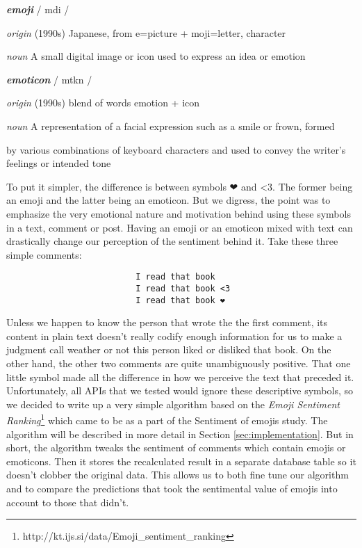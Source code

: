\textbf{\emph{emoji}} 
/ \textsci \textprimstress m\textschwa \textupsilon d\textyogh i /
\begin{adjustwidth}{1cm}{}
\emph{origin}
(1990s) Japanese, from e=picture + moji=letter, character
\end{adjustwidth}
\begin{adjustwidth}{1cm}{}
\emph{noun}
A small digital image or icon used to express an idea or emotion
\end{adjustwidth}

\textbf{\emph{emoticon}}  
/ \textsci \textprimstress m\textschwa \textupsilon t\textsci k\textturnscripta n /
\begin{adjustwidth}{1cm}{}
\emph{origin}
(1990s) blend of words emotion + icon
\end{adjustwidth}
\begin{adjustwidth}{1cm}{}
\emph{noun}
A representation of a facial expression such as a smile or frown, formed 
\begin{adjustwidth}{1cm}{}
by various combinations of keyboard characters and used to convey the writer's feelings or intended tone
\end{adjustwidth}\end{adjustwidth}
To put it simpler, the difference is between symbols ❤ and \textless3. The former being an emoji and the latter being an emoticon. But we digress, the point was to emphasize the very emotional nature and motivation behind using these symbols in a text, comment or post. 
Having an emoji or an emoticon mixed with text can drastically change our perception of the sentiment behind it. Take these three simple comments: 
\begin{verbatim}
                          I read that book
                          I read that book <3
                          I read that book ❤
\end{verbatim}
Unless we happen to know the person that wrote the the first comment, its content in plain text doesn't really codify enough information for us to make a judgment call weather or not this person liked or disliked that book. On the other hand, the other two comments are quite unambiguously positive. 
That one little symbol made all the difference in how we perceive the text that preceded it. 
Unfortunately, all APIs that we tested would ignore these descriptive symbols, so we decided to write up a very simple algorithm based on the \emph{Emoji Sentiment Ranking}\footnote{http://kt.ijs.si/data/Emoji\_sentiment\_ranking} which came to be as a part of the Sentiment of emojis study\cite{Kralj2015emojis}.  
The algorithm will be described in more detail in Section \ref{sec:implementation}.
But in short, the algorithm tweaks the sentiment of comments which contain emojis or emoticons. 
Then it stores the recalculated result in a separate database table so it doesn't clobber the original data. 
This allows us to both fine tune our algorithm and to compare the predictions that took the sentimental value of emojis into account to those that didn't.

